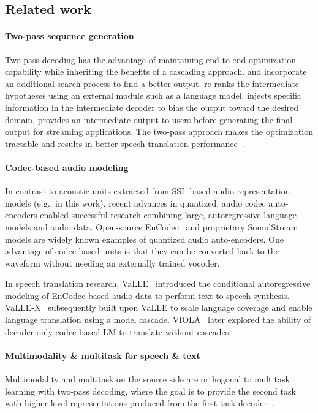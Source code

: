 \subsection{Related work}

\paragraph{Two-pass sequence generation}
Two-pass decoding has the advantage of maintaining end-to-end optimization capability while inheriting the benefits of a cascading approach. \cite{NIPS2017_c6036a69} and \cite{9053606} incorporate an additional search process to find a better output. \cite{dalmia-etal-2021-searchable} re-ranks the intermediate hypotheses using an external module such as a language model.
\cite{zhao19d_interspeech} injects specific information in the intermediate decoder to bias the output toward the desired domain.
\cite{sainath2019two} provides an intermediate output to users before generating the final output for streaming applications. The two-pass approach makes the optimization tractable and results in better speech translation performance~\citep{8682801,anastasopoulos-chiang-2018-tied}.

\paragraph{Codec-based audio modeling}
In contrast to acoustic units extracted from SSL-based  audio representation models (e.g., \xlsr in this work),
recent advances in quantized, audio codec auto-encoders enabled successful research combining large, autoregressive language models and audio data.
Open-source EnCodec~\citep{Defossez2022HighFN} and proprietary SoundStream~\citep{Zeghidour2022SoundStreamAE} models are widely known examples of quantized audio auto-encoders.
One advantage of codec-based units is that they can be converted back to the waveform without needing an externally trained vocoder. 

In speech translation research,
VaLLE~\citep{Wang2023NeuralCL} introduced the conditional autoregressive modeling of EnCodec-based audio data to perform text-to-speech synthesis. VaLLE-X~\citep{Zhang2023SpeakFL} subsequently built upon VaLLE to scale language coverage and enable language translation using a model cascade. VIOLA~\citep{Wang2023-iv} later explored the ability of decoder-only codec-based LM to translate without cascades.

\paragraph{Multimodality \& multitask for speech \& text}
Multimodality and multitask on the source side are orthogonal to multitask learning with two-pass decoding, where the goal is to provide the second task with higher-level representations produced from the first task decoder~\cite{anastasopoulos-chiang-2018-tied}.

